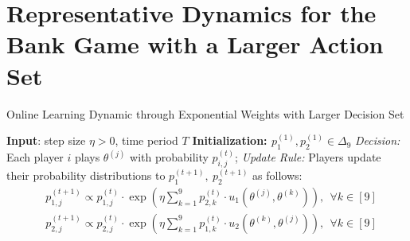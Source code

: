 \section{Representative Dynamics for the Bank Game with a Larger Action Set}
\label{app:3gamma}





\begin{algorithm}[!h]
\caption{Online Learning Dynamic through Exponential Weights with Larger Decision Set}
\begin{algorithmic}
\label{alg:Hedge:L} 
\STATE \textbf{Input}: step size $\eta>0$, time period $T$
    \STATE \textbf{Initialization: $p_1^{(1)},p_2^{(1)}\in\Delta_9$}
\STATE \emph{Decision:} Each player $i$ plays $\theta^{(j)}$ with probability $p_{i,j}^{(t)}$;
\STATE \emph{Update Rule:} Players update their probability distributions to $p_{1}^{(t+1)},~p_{2}^{(t+1)}$ as follows:
\begin{align*}
&p^{(t+1)}_{1,j}\propto p^{(t)}_{1,j} \cdot \exp\left(\eta \sum_{k=1}^9 p^{(t)}_{2,k} \cdot u_1\left(\theta^{(j)},\theta^{(k)}\right)\right),~~\forall k\in[9]\\
&p^{(t+1)}_{2,j}\propto p^{(t)}_{2,j} \cdot \exp\left(\eta \sum_{k=1}^9 p^{(t)}_{1,k} \cdot u_2\left(\theta^{(k)},\theta^{(j)} \right)\right),~~\forall k\in[9]
\end{align*}
\ENDFOR
\end{algorithmic}
\end{algorithm}
